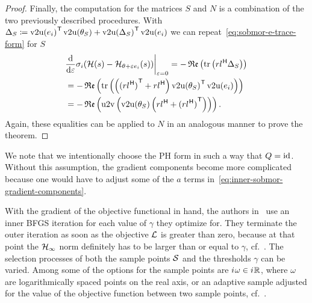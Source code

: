 \begin{proof}
    Finally, the computation for the matrices $S$ and $N$ is a combination of the two previously described procedures.
    With $\Delta_S \coloneqq {\mathop{}\!\mathrm{v}2\mathrm{u}(e_i)}^{\mkern1mu \mathsf{T}} \mathop{}\!\mathrm{v}2\mathrm{u}(\theta_S) + {\mathop{}\!\mathrm{v}2\mathrm{u}(\Delta_S)}^{\mkern1mu \mathsf{T}} \mathop{}\!\mathrm{v}2\mathrm{u}(e_i)$ we can repeat~\eqref{eq:sobmor-e-trace-form} for $S$
    \begin{equation*}
        \begin{aligned}
            &\res{\frac{\dif}{\dif \varepsilon} \sigma_i(\mcl{H}(s) - \mcl{H}_{\theta + \varepsilon e_i}(s))}{\varepsilon = 0} = - \re{\trace{r l\herm \Delta_S}} \\
             &= - \re{\trace{\left( {(r l\herm)}\trans + r l\herm \right) {\vecupper(\theta_S)}\trans \vecupper(e_i)}} \\
             &= - \re{\uppervec\left( \vecupper(\theta_S) \left( r l\herm + {(r l\herm)}\trans \right) \right)}.
        \end{aligned}
    \end{equation*}
    Again, these equalities can be applied to $N$ in an analogous manner to prove the theorem.

\end{proof}

\begin{remark}
    We note that we intentionally choose the \ac{PH} form in such a way that $Q = \text{id}_{}$.
    Without this assumption, the gradient components become more complicated because one would have to adjust some of the $a$ terms in~\eqref{eq:inner-sobmor-gradient-components}.
\end{remark}

With the gradient of the objective functional in hand, the authors in~\cite{Schwerdtner2023} use an inner \ac{BFGS} iteration for each value of $\gamma$ they optimize for.
They terminate the outer iteration as soon as the objective $\mathcal{L}$ is greater than zero, because at that point the $\mathcal{H}_\infty$ norm definitely has to be larger than or equal to $\gamma$, cf.~\cite[Section~3.2.2]{Schwerdtner2023}.
The selection processes of both the sample points $\mathcal{S}$ and the thresholds $\gamma$ can be varied.
Among some of the options for the sample points are ${i\mkern1mu} \omega \in {i\mkern1mu} \mathbb{R}$, where $\omega$ are logarithmically spaced points on the real axis, or an adaptive sample adjusted for the value of the objective function between two sample points, cf.~\cite{SV2021}.

